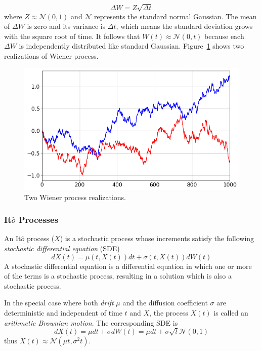 \begin{equation}
\Delta W = Z\sqrt{\Delta t}
\end{equation}
where $Z\approx \mathcal{N}(0, 1)$ and $\mathcal{N}$ represents the standard normal Gaussian. 
The mean of $\Delta W$ is zero and its variance is $\Delta t$, which means the standard deviation grows with the square root of time. It follows that $W(t)\approx \mathcal{N}(0, t)$ because each $\Delta W$ is independently distributed like standard Gaussian. Figure~\ref{fig:wiener_process} shows two realizations of Wiener process.

\begin{figure}[htb]
	\centering
	\includegraphics[width=0.7\linewidth]{figures/wiener_process.png}
	\caption{Two Wiener process realizations.}
	\label{fig:wiener_process}
\end{figure}

\subsubsection{It$\hat{o}$ Processes} 
An It$\hat{o}$ process ($X$) is a stochastic process whose increments satisfy the following \emph{stochastic differential equation} (SDE) 
\begin{equation}
dX(t) = \mu(t, X(t)) dt + \sigma(t, X(t)) dW(t)
\end{equation}
A stochastic differential equation is a differential equation in which one or more of the terms is a stochastic process, resulting in a solution which is also a stochastic process.

In the special case where both \emph{drift} $\mu$ and the diffusion coefficient $\sigma$ are deterministic and independent of time $t$ and $X$, the process $X(t)$ is called an \emph{arithmetic Brownian motion}. The corresponding SDE is
\begin{equation}
dX(t) = \mu dt + \sigma dW(t) = \mu dt + \sigma \sqrt{t} \mathcal{N}(0,1) 
\end{equation}
thus $X(t)\approx \mathcal{N}(\mu t, \sigma^2 t)$.

